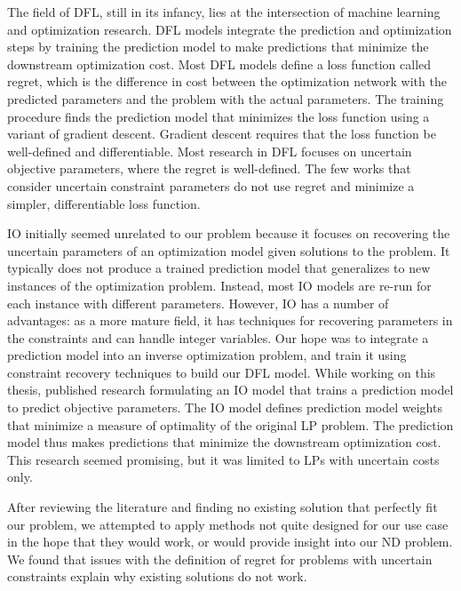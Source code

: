 The field of DFL, still in its infancy, lies at the intersection of machine learning and optimization research. 
DFL models integrate the prediction and optimization steps by training the prediction model to make predictions that minimize the downstream optimization cost.
Most DFL models define a loss function called regret, which is the difference in cost between the optimization network with the predicted parameters and the problem with the actual parameters. 
The training procedure finds the prediction model that minimizes the loss function using a variant of gradient descent. Gradient descent requires that the loss function be well-defined and differentiable. 
Most research in DFL focuses on uncertain objective parameters, where the regret is well-defined. 
The few works that consider uncertain constraint parameters do not use regret and minimize a simpler, differentiable loss function. 

IO initially seemed unrelated to our problem because it focuses on recovering the uncertain parameters of an optimization model given solutions to the problem. 
It typically does not produce a trained prediction model that generalizes to new instances of the optimization problem. 
Instead, most IO models are re-run for each instance with different parameters. 
However, IO has a number of advantages: as a more mature field, it has techniques for recovering parameters in the constraints and can handle integer variables. 
Our hope was to integrate a prediction model into an inverse optimization problem, and train it using constraint recovery techniques to build our DFL model.
While working on this thesis, \cite{sunMaximumOptimalityMargin2023} published research formulating an IO model that trains a prediction model to predict objective parameters.
The IO model defines prediction model weights that minimize a measure of optimality of the original LP problem. 
The prediction model thus makes predictions that minimize the downstream optimization cost. 
This research seemed promising, but it was limited to LPs with uncertain costs only.

After reviewing the literature and finding no existing solution that perfectly fit our problem, we attempted to apply methods not quite designed for our use case in the hope that they would work, or would provide insight into our ND problem. We found that issues with the definition of regret for problems with uncertain constraints explain why existing solutions do not work. 


